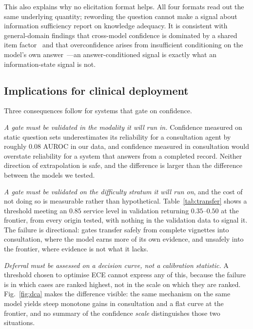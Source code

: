 \documentclass[journal,twoside]{IEEEtran}
\begin{document}
This also explains why no elicitation format helps. All four formats read out the same underlying
quantity; rewording the question cannot make a signal about information sufficiency report on
knowledge adequacy. It is consistent with general-domain findings that cross-model confidence is
dominated by a shared item factor~\cite{metacog2026} and that overconfidence arises from
insufficient conditioning on the model's own answer~\cite{advice2025}---an answer-conditioned signal
is exactly what an information-state signal is not.

\subsection{Implications for clinical deployment}
Three consequences follow for systems that gate on confidence.

\emph{A gate must be validated in the modality it will run in.} Confidence measured on static
question sets underestimates its reliability for a consultation agent by roughly $0.08$ AUROC in our
data, and confidence measured in consultation would overstate reliability for a system that answers
from a completed record. Neither direction of extrapolation is safe, and the difference is larger
than the difference between the models we tested.

\emph{A gate must be validated on the difficulty stratum it will run on}, and the cost of not doing
so is measurable rather than hypothetical. Table~\ref{tab:transfer} shows a threshold meeting an
$0.85$ service level in validation returning $0.35$--$0.50$ at the frontier, from every origin
tested, with nothing in the validation data to signal it. The failure is directional: gates transfer
safely from complete vignettes into consultation, where the model earns more of its own evidence, and
unsafely into the frontier, where evidence is not what it lacks.

\emph{Deferral must be assessed on a decision curve, not a calibration statistic.} A threshold chosen
to optimise ECE cannot express any of this, because the failure is in which cases are ranked highest,
not in the scale on which they are ranked. Fig.~\ref{fig:dca} makes the difference visible: the same
mechanism on the same model yields steep monotone gains in consultation and a flat curve at the
frontier, and no summary of the confidence \emph{scale} distinguishes those two situations.
\end{document}
